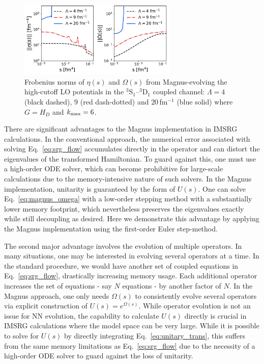 \documentclass[10pt,aps,prc,floatfix,twocolumn,nofootinbib]{revtex4-1}
\begin{document}
%
\begin{figure}[tbh]
	\includegraphics[clip,width=0.67\textwidth]{eta_omega_norms_kvnns_900_901_902_3S1_Wegner_k_magnus_6_ds1p0e-05.pdf}%
	\caption{Frobenius norms of $\eta(s)$ and $\Omega(s)$ from Magnus-evolving the high-cutoff LO potentials in the $^3$S$_1$--$^3$D$_1$ coupled channel: $\Lambda=4$ (black dashed), $9$ (red dash-dotted) and $20$\,fm$^{-1}$ (blue solid) where $G=H_D$ and $k_{\rm max}=6$.}
	\label{fig:eta_omega_norms}
\end{figure}
%

There are significant advantages to the Magnus implementation in IMSRG calculations.
In the conventional approach, the numerical error associated with solving Eq.~\eqref{eq:srg_flow} accumulates directly in the operator and can distort the eigenvalues of the transformed Hamiltonian.
To guard against this, one must use a high-order ODE solver, which can become prohibitive for large-scale calculations due to the memory-intensive nature of such solvers.  
In the Magnus implementation, unitarity is guaranteed by the form of $U(s)$.
One can solve Eq.~\eqref{eq:magnus_omega} with a low-order stepping method with a substantially lower memory footprint, which nevertheless preserves the eigenvalues exactly while still decoupling as desired.
Here we demonstrate this advantage by applying the Magnus implementation using the first-order Euler step-method.


The second major advantage involves the evolution of multiple operators.
In many situations, one may be interested in evolving several operators at a time.
In the standard procedure, we would have another set of coupled equations in Eq.~\eqref{eq:srg_flow}, drastically increasing memory usage.
Each additional operator increases the set of equations - say $N$ equations - by another factor of $N$.
In the Magnus approach, one only needs $\Omega(s)$ to consistently evolve several operators via explicit construction of $U(s)=e^{\Omega(s)}$.
While operator evolution is not an issue for NN evolution, the capability to calculate $U(s)$ directly is crucial in IMSRG calculations where the model space can be very large.
While it is possible to solve for $U(s)$ by directly integrating Eq.~\eqref{eq:unitary_trans}, this suffers from the same memory limitations as Eq.~\eqref{eq:srg_flow} due to the necessity of a high-order ODE solver to guard against the loss of unitarity.
\end{document}
